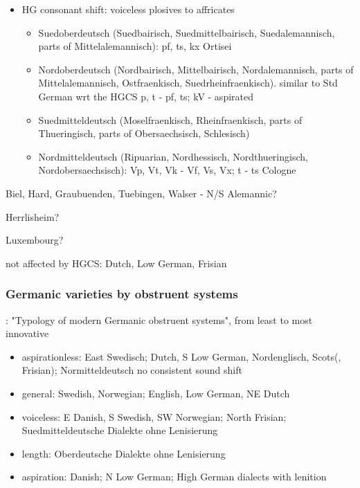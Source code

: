 \documentclass[a4paper]{article}
\begin{document}
\begin{itemize}
  \item HG consonant shift: voiceless plosives to affricates 
  \begin{itemize}
    \item Suedoberdeutsch (Suedbairisch, Suedmittelbairisch, Suedalemannisch, parts of Mittelalemannisch): pf, ts, kx
    Ortisei
    \item Nordoberdeutsch (Nordbairisch, Mittelbairisch, Nordalemannisch, parts of Mittelalemannisch, Ostfraenkisch, Suedrheinfraenkisch).
    similar to Std German wrt the HGCS
    p, t - pf, ts; kV - aspirated
    \item Suedmitteldeutsch (Moselfraenkisch, Rheinfraenkisch, parts of Thueringisch, parts of Obersaechsisch, Schlesisch)
    \item Nordmitteldeutsch (Ripuarian, Nordhessisch, Nordthueringisch, Nordobersaechsisch):
    Vp, Vt, Vk - Vf, Vs, Vx; t - ts
    Cologne
  \end{itemize}
\end{itemize}

Biel, Hard, Graubuenden, Tuebingen, Walser - N/S Alemannic?

Herrlisheim?

Luxembourg?

not affected by HGCS: Dutch, Low German, Frisian

\subsubsection{Germanic varieties by obstruent systems}
\citet[pp. 215-235]{goblirsch2005lautverschiebungen}: "Typology of modern Germanic obstruent systems", from least to most innovative

\begin{itemize}
  \item aspirationless:
  East Swedisch; Dutch, S Low German, Nordenglisch, Scots(, Frisian); Normitteldeutsch
  no consistent sound shift
  \item general:
  Swedish, Norwegian; English, Low German, NE Dutch
  \item voiceless:
  E Danish, S Swedish, SW Norwegian; North Frisian; Suedmitteldeutsche Dialekte ohne Lenisierung
  \item length:
  Oberdeutsche Dialekte ohne Lenisierung
  \item aspiration:
  Danish; N Low German; High German dialects with lenition
\end{itemize}
\end{document}
